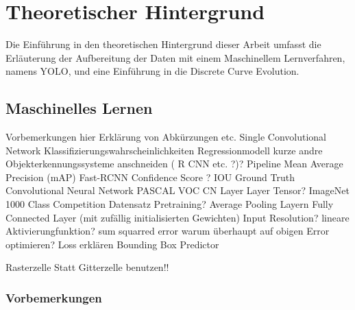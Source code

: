 \chapter{Theoretischer Hintergrund}
\label{ch:Theoretischer Hintergrund}
{Die Einführung in den theoretischen Hintergrund dieser Arbeit umfasst die Erläuterung der Aufbereitung der Daten mit einem Maschinellem Lernverfahren, namens YOLO, und eine Einführung in die \glqq Discrete Curve Evolution\grqq{}.
}



\section{Maschinelles Lernen}
{	Vorbemerkungen hier Erklärung von Abkürzungen etc.
Single Convolutional Network
Klassifizierungswahrscheinlichkeiten
Regressionmodell
kurze andre Objekterkennungssysteme anschneiden ( R CNN etc. ?)?
Pipeline
Mean Average Precision (mAP)
Fast-RCNN
Confidence Score ? 
IOU
Ground Truth
Convolutional Neural Network
PASCAL VOC
CN Layer
Layer
Tensor?
ImageNet 1000 Class Competition Datensatz
Pretraining?
Average Pooling Layern
Fully Connected Layer (mit zufällig initialisierten Gewichten)
Input Resolution?
lineare Aktivierungfunktion?
sum squarred error
warum überhaupt auf obigen Error optimieren?
Loss erklären
Bounding Box Predictor


Rasterzelle Statt Gitterzelle benutzen!!
	\subsection{Vorbemerkungen}
}
